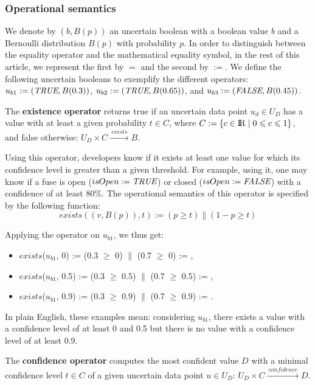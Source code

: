 \subsubsection{Operational semantics}
We denote by $(b, B(p))$ an uncertain boolean with a boolean value $b$ and a Bernoulli distribution $B(p)$ with probability $p$.
In order to distinguish between the equality operator and the mathematical equality symbol, in the rest of this article, we represent the first by $=$ and the second by $:=$.
We define the following uncertain booleans to exemplify the different operators: $u_{b1} := (\textit{TRUE}{}, B(0.3))$, $u_{b2} := (\textit{TRUE}{}, B(0.65))$, and $u_{b3} := (\textit{FALSE}{}, B(0.45))$.

\begin{operator}
	\label{op:existence}
	The \textbf{existence operator} returns true if an uncertain data point $u_d \in U_D$ has a value with at least a given probability $t \in C$, where $C := \{ c \in {\rm I\!R} \mid 0 \leqslant c \leqslant 1 \}$, and false otherwise:  $U_D \times C \xrightarrow{~exists~} B$.
\end{operator}

Using this operator, developers know if it exists at least one value for which its confidence level is greater than a given threshold. For example, using it, one may know if a fuse is open ($isOpen := \textit{TRUE}{}$) or closed ($isOpen := \textit{FALSE}{}$) with a confidence of at least 80\%.
The operational semantics of this operator is specified by the following function: $$exists((v, B(p)), t) := (p \geqslant t) \| (1-p \geqslant t)$$

Applying the operator on $u_{b1}$, we thus get:
\begin{itemize}
    \item $exists$($u_{b1}$, 0) := (0.3 $\geqslant$ 0) $\|$ (0.7 $\geqslant$ 0) := \true{},
    \item $exists$($u_{b1}$, 0.5) := (0.3 $\geqslant$ 0.5) $\|$ (0.7 $\geqslant$ 0.5) := \true{},
    \item $exists$($u_{b1}$, 0.9) := (0.3 $\geqslant$ 0.9) $\|$ (0.7 $\geqslant$ 0.9) := \false{}.
\end{itemize}
In plain English, these examples mean: considering $u_{b1}$, there exists a value with a confidence level of at least 0 and 0.5 but there is no value with a confidence level of at least  0.9.

\begin{operator}
	\label{op:confidence}
	The \textbf{confidence operator} computes the most confident value $D$ with a minimal confidence level $t \in C$ of a given uncertain data point $u \in U_D$: $U_D \times C \xrightarrow{~confidence~ }  D$.
\end{operator}

